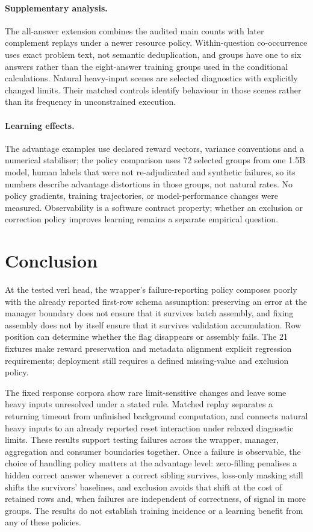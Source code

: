 \documentclass[10pt,a4paper]{article}
\begin{document}
\paragraph{Supplementary analysis.}
The all-answer extension combines the audited main counts with later
complement replays under a newer resource policy. Within-question
co-occurrence uses exact problem text, not semantic deduplication, and
groups have one to six answers rather than the eight-answer training
groups used in the conditional calculations. Natural heavy-input scenes
are selected diagnostics with explicitly changed limits. Their matched
controls identify behaviour in those scenes rather than its frequency
in unconstrained execution.

\paragraph{Learning effects.}
The advantage examples use declared reward vectors, variance conventions
and a numerical stabiliser; the policy comparison uses 72 selected groups
from one 1.5B model, human labels that were not re-adjudicated and
synthetic failures, so its numbers describe advantage distortions in those
groups, not natural rates. No policy gradients, training trajectories,
or model-performance changes were measured. Observability is a software
contract property; whether an exclusion or correction policy improves
learning remains a separate empirical question.

\section{Conclusion}

At the tested verl head, the wrapper's failure-reporting policy composes
poorly with the already reported first-row schema assumption: preserving
an error at the manager boundary does not ensure that it survives batch
assembly, and fixing assembly does not by itself ensure that it survives
validation accumulation. Row position can determine whether the flag
disappears or assembly fails. The 21 fixtures make reward preservation and metadata
alignment explicit regression requirements; deployment still requires a
defined missing-value and exclusion policy.

The fixed response corpora show rare limit-sensitive changes and leave
some heavy inputs unresolved under a stated rule. Matched replay separates a returning timeout
from unfinished background computation, and connects natural heavy inputs
to an already reported reset interaction under relaxed diagnostic limits.
These results support testing failures across the wrapper, manager,
aggregation and consumer boundaries together. Once a failure is observable,
the choice of handling policy matters at the advantage level: zero-filling
penalises a hidden correct answer whenever a correct sibling survives,
loss-only masking still shifts the survivors' baselines, and exclusion avoids
that shift at the cost of retained rows and, when failures are independent of
correctness, of signal in more groups. The results do not
establish training incidence or a learning benefit from any of these
policies.
\end{document}
